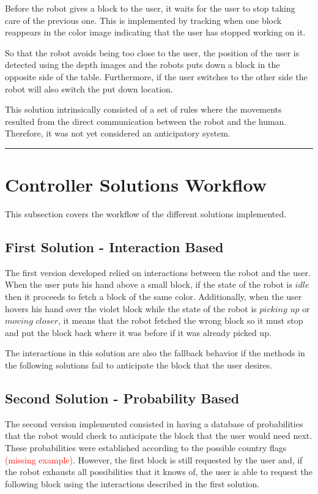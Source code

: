 {Before the robot gives a block to the user, it waits for the user to stop taking care of the previous one. This is implemented by tracking when one block reappears in the color image indicating that the user has stopped working on it.

So that the robot avoids being too close to the user, the position of the user is detected using the depth images and the robots puts down a block in the opposite side of the table. Furthermore, if the user switches to the other side the robot will also switch the put down location.

This solution intrinsically consisted of a set of rules where the movements resulted from the direct communication between the robot and the human. Therefore, it was not yet considered an anticipatory system.
}
{\color{red} \rule{\linewidth}{0.5mm}}

\fi

\section{Controller Solutions Workflow}

This subsection covers the workflow of the different solutions implemented.

\subsection{First Solution - Interaction Based}

The first version developed relied on interactions between the robot and the user. When the user puts his hand above a small block, if the state of the robot is $idle$ then it proceeds to fetch a block of the same color. Additionally, when the user hovers his hand over the violet block while the state of the robot is $picking$ $up$ or $moving$ $closer$, it means that the robot fetched the wrong block so it must stop and put the block back where it was before if it was already picked up.

The interactions in this solution are also the fallback behavior if the methods in the following solutions fail to anticipate the block that the user desires.

\subsection{Second Solution - Probability Based}

The second version implemented consisted in having a database of probabilities that the robot would check to anticipate the block that the user would need next. These probabilities were established according to the possible country flags \textcolor{red}{(missing example)}. However, the first block is still requested by the user and, if the robot exhausts all possibilities that it knows of, the user is able to request the following block using the interactions described in the first solution.

